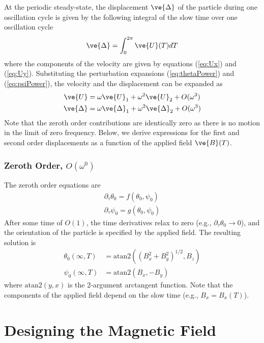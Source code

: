 At the periodic steady-state, the displacement $\ve{\Delta}$ of the particle during one oscillation cycle is given by the following integral of the slow time over one oscillation cycle
\begin{equation}
    \ve{\Delta} = \int_0^{2\pi} \ve{U}(T) dT
\end{equation}
where the components of the velocity are given by equations (\ref{eq:Ux}) and (\ref{eq:Uy}).  Substituting the perturbation expansions (\ref{eq:thetaPower}) and (\ref{eq:psiPower}), the velocity and the displacement can be expanded as
\begin{align}
    \ve{U} &= \omega \ve{U}_1 + \omega^2 \ve{U}_2 + O(\omega^3)
    \\
    \ve{\Delta} &= \omega \ve{\Delta}_1 + \omega^2 \ve{\Delta}_2 + O(\omega^3)
\end{align}
Note that the zeroth order contributions are identically zero as there is no motion in the limit of zero frequency. Below, we derive expressions for the first and second order displacements as a function of the applied field $\ve{B}(T)$.

\subsubsection*{Zeroth Order, $O(\omega^0)$}

The zeroth order equations are 
\begin{align}
    \partial_{\tau} \theta_0 = f(\theta_0,\psi_0)
    \\
    \partial_{\tau} \psi_0 = g(\theta_0,\psi_0)
\end{align}
After some time of $O(1)$, the time derivatives relax to zero (e.g., $\partial_{\tau} \theta_0\rightarrow 0$), and the orientation of the particle is specified by the applied field. The resulting solution is 
\begin{align}
    \theta_0(\infty,T) &= \mathrm{atan2}((B_x^2+B_y^2)^{1/2},B_z) \label{eq:theta0}
    \\
    \psi_0(\infty,T) &= \mathrm{atan2}(B_x,-B_y) \label{eq:psi0}
\end{align}
where $\mathrm{atan2}(y,x)$ is the 2-argument arctangent function. Note that the components of the applied field depend on the slow time (e.g., $B_x = B_x(T)$).

\section{Designing the Magnetic Field}

